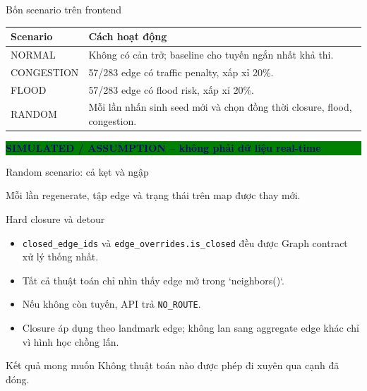 \documentclass[aspectratio=169,11pt]{beamer}
\newcommand{\pill}[2]{\colorbox{#1}{\textcolor{navy}{\strut\textbf{#2}}}}
\begin{document}
\begin{frame}{Bốn scenario trên frontend}
\begin{tabularx}{\textwidth}{l X}
\toprule
Scenario & Cách hoạt động\\
\midrule
NORMAL & Không có cản trở; baseline cho tuyến ngắn nhất khả thi.\\
CONGESTION & 57/283 edge có traffic penalty, xấp xỉ 20\%.\\
FLOOD & 57/283 edge có flood risk, xấp xỉ 20\%.\\
RANDOM & Mỗi lần nhấn sinh seed mới và chọn đồng thời closure, flood, congestion.\\
\bottomrule
\end{tabularx}
\vfill
\centering\pill{green}{SIMULATED / ASSUMPTION -- không phải dữ liệu real-time}
\end{frame}

\begin{frame}{Random scenario: cả kẹt và ngập}
\begin{center}
\end{center}
\vfill
\centering Mỗi lần regenerate, tập edge và trạng thái trên map được thay mới.
\end{frame}

\begin{frame}{Hard closure và detour}
\begin{itemize}
  \item \texttt{closed\_edge\_ids} và \texttt{edge\_overrides.is\_closed} đều được Graph contract xử lý thống nhất.
  \item Tất cả thuật toán chỉ nhìn thấy edge mở trong `neighbors()`.
  \item Nếu không còn tuyến, API trả \texttt{NO\_ROUTE}.
  \item Closure áp dụng theo landmark edge; không lan sang aggregate edge khác chỉ vì hình học chồng lấn.
\end{itemize}
\begin{alertblock}{Kết quả mong muốn}
Không thuật toán nào được phép đi xuyên qua cạnh đã đóng.
\end{alertblock}
\end{frame}
\end{document}
